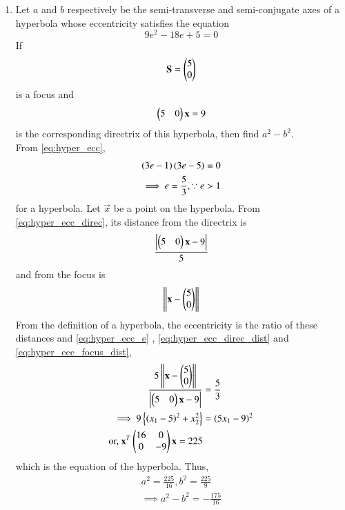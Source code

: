 \documentclass[journal,12pt,twocolumn]{IEEEtran}
\begin{document}
\begin{enumerate}[label=\arabic*]
\item Let $a$ and $b$ respectively be the semi-transverse and semi-conjugate axes of a hyperbola whose 
eccentricity satisfies the equation
\begin{equation}
\label{eq:hyper_ecc}
9e^2-18e+5 = 0
\end{equation}
If 
\begin{equation} 
\label{eq:hyper_ecc_focus}
\mathbf{S}=\begin{pmatrix}5\\ 0\end{pmatrix}
\end{equation}
is a focus and 
\begin{equation} 
\label{eq:hyper_ecc_direc}
\begin{pmatrix}5 & 0\end{pmatrix}\mathbf{x} = 9
\end{equation} 
%
is the corresponding directrix of this hyperbola, then find $a^2-b^2$.
\\
\solution From \eqref{eq:hyper_ecc},
\begin{align}
\left(3e-1\right)\left(3e-5\right) = 0
\\
\implies e = \frac{5}{3}, \because e > 1
\label{eq:hyper_ecc_e}
\end{align}
%
for a hyperbola.  
Let $\vec{x}$ be a point on the hyperbola.  
From \eqref{eq:hyper_ecc_direc}, its distance from the directrix is
%
\begin{align}
\label{eq:hyper_ecc_direc_dist}
\frac{\left\vert\begin{pmatrix}5 & 0\end{pmatrix}\mathbf{x} - 9\right\vert}{5}
\end{align}
%
and from the focus is 
\begin{align}
\label{eq:hyper_ecc_focus_dist}
\left\Vert\mathbf{x}-\begin{pmatrix}5\\0\end{pmatrix}\right\Vert
\end{align}
From the definition of a hyperbola, the eccentricity is the ratio of these distances and \eqref{eq:hyper_ecc_e}
, \eqref{eq:hyper_ecc_direc_dist}
 and \eqref{eq:hyper_ecc_focus_dist},
\begin{align}
\frac{5\left\Vert\mathbf{x}-\begin{pmatrix}5\\0\end{pmatrix}\right\Vert}{\left\vert\begin{pmatrix}5 & 0\end{pmatrix}\mathbf{x} - 9\right\vert} &= \frac{5}{3}
\\
\implies 9\left\{\left(x_1-5\right)^2+x_2^2\right\}&=  \left(5x_1-9\right)^2
\\
\text{or, } \mathbf{x}^T\begin{pmatrix}16 & 0 \\ 0 & -9\end{pmatrix}\mathbf{x} = 225
\end{align}
%
which is the equation of the hyperbola.  Thus, 
\begin{align}
a^2 = \frac{225}{16}, b^2 = \frac{225}{9}
\\
\implies a^2-b^2 = -\frac{175}{16}
\end{align}



\end{enumerate}
\end{document}
